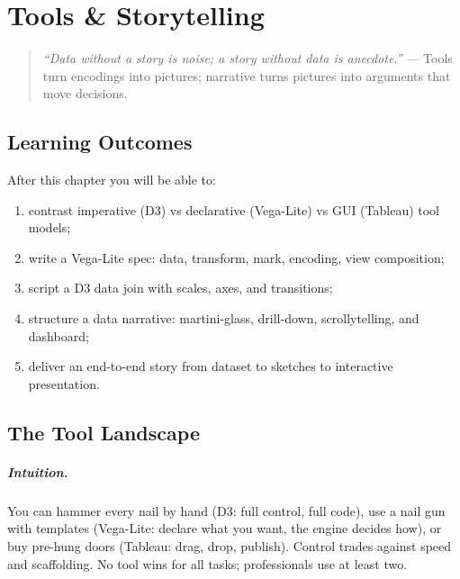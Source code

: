 \chapter{Tools \& Storytelling}
\label{ch:tools-storytelling}
\sloppy

\begin{quote}
\emph{``Data without a story is noise; a story without data is anecdote.''} --- Tools turn encodings into pictures; narrative turns pictures into arguments that move decisions.
\end{quote}

\noindent{}
\vspace{0.4em}

\section*{Learning Outcomes}
After this chapter you will be able to:
\begin{enumerate}[label=(L\arabic*)]
    \item contrast imperative (D3) vs declarative (Vega-Lite) vs GUI (Tableau) tool models;
    \item write a Vega-Lite spec: data, transform, mark, encoding, view composition;
    \item script a D3 data join with scales, axes, and transitions;
    \item structure a data narrative: martini-glass, drill-down, scrollytelling, and dashboard;
    \item deliver an end-to-end story from dataset to sketches to interactive presentation.
\end{enumerate}

\section{The Tool Landscape}
\label{sec:tool-landscape}
\paragraph{Intuition.} You can hammer every nail by hand (D3: full control, full code), use a nail gun with templates (Vega-Lite: declare what you want, the engine decides how), or buy pre-hung doors (Tableau: drag, drop, publish). Control trades against speed and scaffolding. No tool wins for all tasks; professionals use at least two.

